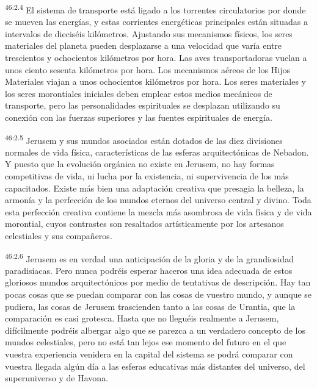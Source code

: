 \par
\textsuperscript{46:2.4} El sistema de transporte está ligado a los torrentes circulatorios por donde se mueven las energías, y estas corrientes energéticas principales están situadas a intervalos de dieciséis kilómetros. Ajustando sus mecanismos físicos, los seres materiales del planeta pueden desplazarse a una velocidad que varía entre trescientos y ochocientos kilómetros por hora. Las aves transportadoras vuelan a unos ciento sesenta kilómetros por hora. Los mecanismos aéreos de los Hijos Materiales viajan a unos ochocientos kilómetros por hora. Los seres materiales y los seres morontiales iniciales deben emplear estos medios mecánicos de transporte, pero las personalidades espirituales se desplazan utilizando su conexión con las fuerzas superiores y las fuentes espirituales de energía.

\par
\textsuperscript{46:2.5} Jerusem y sus mundos asociados están dotados de las diez divisiones normales de vida física, características de las esferas arquitectónicas de Nebadon. Y puesto que la evolución orgánica no existe en Jerusem, no hay formas competitivas de vida, ni lucha por la existencia, ni supervivencia de los más capacitados. Existe más bien una adaptación creativa que presagia la belleza, la armonía y la perfección de los mundos eternos del universo central y divino. Toda esta perfección creativa contiene la mezcla más asombrosa de vida física y de vida morontial, cuyos contrastes son resaltados artísticamente por los artesanos celestiales y sus compañeros.

\par
\textsuperscript{46:2.6} Jerusem es en verdad una anticipación de la gloria y de la grandiosidad paradisiacas. Pero nunca podréis esperar haceros una idea adecuada de estos gloriosos mundos arquitectónicos por medio de tentativas de descripción. Hay tan pocas cosas que se puedan comparar con las cosas de vuestro mundo, y aunque se pudiera, las cosas de Jerusem trascienden tanto a las cosas de Urantia, que la comparación es casi grotesca. Hasta que no lleguéis realmente a Jerusem, difícilmente podréis albergar algo que se parezca a un verdadero concepto de los mundos celestiales, pero no está tan lejos ese momento del futuro en el que vuestra experiencia venidera en la capital del sistema se podrá comparar con vuestra llegada algún día a las esferas educativas más distantes del universo, del superuniverso y de Havona.

